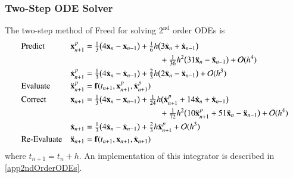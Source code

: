 \subsubsection{Two-Step ODE Solver}

The two-step method of Freed \cite{Freed17a} for solving $2^{\text{nd}}$ order ODEs is
\begin{subequations}
    \label{pairedMethods}
    \begin{align}
    \mbox{} & \text{Predict} &
    \mathbf{x}_{n+1}^p & = \tfrac{1}{3} \bigl(
    4 \mathbf{x}_n - \mathbf{x}_{n-1} \bigr) + 
    \tfrac{1}{6} h \bigl( 3 \dot{\mathbf{x}}_n + 
    \dot{\mathbf{x}}_{n-1} \bigr) \notag \\ 
    \mbox{} & & & \hspace{3.175cm} + 
    \tfrac{1}{36} h^2 \bigl( 31 \ddot{\mathbf{x}}_n - 
    \ddot{\mathbf{x}}_{n-1} \bigr) + \mathcal{O} (h^4) 
    \label{displacementPredictor} \\
    \mbox{} & &
    \dot{\mathbf{x}}_{n+1}^p & = \tfrac{1}{3} 
    \bigl( 4 \dot{\mathbf{x}}_n - \dot{\mathbf{x}}_{n-1} \bigr) + 
    \tfrac{2}{3} h \bigl( 2\ddot{\mathbf{x}}_n - \ddot{\mathbf{x}}_{n-1} 
    \bigr) + \mathcal{O} (h^3)
    \label{velocityPredictor} \\
    \mbox{} & \text{Evaluate} &
    \ddot{\mathbf{x}}^p_{n+1} & = \mathbf{f} (t_{n+1}, \mathbf{x}^p_{n+1}, \dot{\mathbf{x}}^p_{n+1}) 
    \label{2ndEvaluate} \\
    \mbox{} & \text{Correct} & 
    \mathbf{x}_{n+1} & = \tfrac{1}{3} \bigl(
    4  \mathbf{x}_n - \mathbf{x}_{n-1} \bigr) +
    \tfrac{1}{24} h \bigl( \dot{\mathbf{x}}^p_{n+1} +
    14 \dot{\mathbf{x}}_n + \dot{\mathbf{x}}_{n-1} \bigr) 
    \notag \\
    \mbox{} & & & \hspace{3.175cm} +
    \tfrac{1}{72} h^2 \bigl( 10 \ddot{\mathbf{x}}^p_{n+1} + 
    51 \ddot{\mathbf{x}}_n - \ddot{\mathbf{x}}_{n-1} \bigr) + 
    \mathcal{O} (h^4)
    \label{displacementCorrector} \\ 
    \mbox{} & &
    \dot{\mathbf{x}}_{n+1} & = \tfrac{1}{3} 
    \bigl( 4 \dot{\mathbf{x}}_n - \dot{\mathbf{x}}_{n-1} \bigr) + 
    \tfrac{2}{3} h \ddot{\mathbf{x}}^p_{n+1} + \mathcal{O} (h^3)
    \label{velocityCorrector} \\
    \mbox{} & \text{Re-Evaluate} & 
    \ddot{\mathbf{x}}_{n+1} & = \mathbf{f} (t_{n+1}, \mathbf{x}_{n+1}, \dot{\mathbf{x}}_{n+1})
    \label{2ndReEvaluate}
    \end{align}
\end{subequations}
where $t_{n+1} = t_n + h$.  An implementation of this integrator is described in \ref{app2ndOrderODEs}.  


